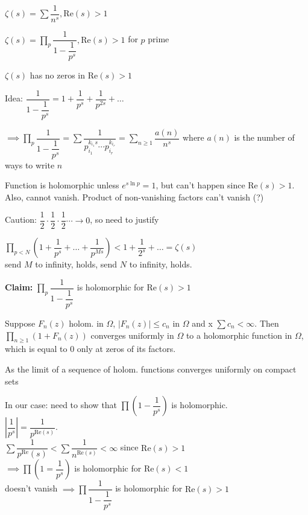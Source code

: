 \documentclass[twoside, 10pt]{article}
\renewcommand{\Re}{\text{Re}}
\begin{document}
$\zeta(s) = \sum \dfrac{1}{n^s}, \Re(s) > 1$

\begin{defn}
   $\zeta(s) = \prod\limits_{p} \dfrac{1}{1-{\dfrac{1}{p^s}}}, \Re(s) > 1$ for $p$ prime
\end{defn}

\begin{cor}
   $\zeta(s)$ has no zeros in $\Re(s) > 1$
\end{cor}

Idea: $\dfrac{1}{1-\dfrac{1}{p^s}} = 1 + \dfrac{1}{p^s} + \dfrac{1}{p^{2s}} + \ldots$

$\implies \prod\limits_{p} \dfrac{1}{1-{\dfrac{1}{p^s}}} = \sum \dfrac{1}{p_{i_1}^{k_{i_1} s}\cdots p_{i_r}^{k_{i_r}}} = \sum\limits_{n \geq 1} \dfrac{a(n)}{n^s}$ where $a(n)$ is the number of ways to write $n$

Function is holomorphic unless $e^{s\ln p} = 1$, but can't happen since $\Re(s) > 1$. Also, cannot vanish. Product of non-vanishing factors can't vanish (?)

Caution: $\dfrac{1}{2} \cdot\dfrac{1}{2} \cdot\dfrac{1}{2} \cdots \to 0$, so need to justify

$\prod\limits_{p < N} (1 + \dfrac{1}{p^s} + \ldots + \dfrac{1}{p^{Ms}}) < 1 + \dfrac{1}{2^s} + \ldots = \zeta(s)$\\
send $M$ to infinity, holds, send $N$ to infinity, holds. %

\textbf{Claim:} $\prod\limits_{p} \dfrac{1}{1-{\dfrac{1}{p^s}}}$ is holomorphic for $\Re(s) > 1$

\begin{prop}
   Suppose $F_n(z)$ holom. in $\Omega$, $|F_n(z)| \leq c_n$ in $\Omega$ and x $\sum c_n < \infty$. Then $\prod_{n \geq 1} (1 + F_n(z))$ converges uniformly in $\Omega$ to a holomorphic function in $\Omega$, which is equal to 0 only at zeros of its factors.
\end{prop}
As the limit of a sequence of holom. functions converges uniformly on compact sets %

In our case: need to show that $\prod (1 - \dfrac{1}{p^s})$ is holomorphic. \\
$\left|\dfrac{1}{p^s}\right| = \dfrac{1}{p^{\Re(s)}}$.\\
$\sum \dfrac{1}{p^\Re(s)} < \sum \dfrac{1}{n^{\Re(s)}} < \infty$ since $\Re(s) > 1$\\
$\implies  \prod(1 = \dfrac{1}{p^s})$ is holomorphic for $\Re(s) < 1$\\
doesn't vanish $\implies \prod \dfrac{1}{1-\dfrac{1}{p^s}}$ is holomorphic for $\Re(s) > 1$
\end{document}
